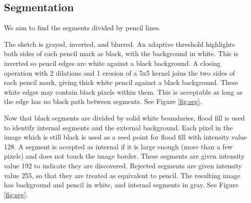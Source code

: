 \documentclass[11pt]{IEEEtran}
\begin{document}
\subsection{Segmentation}
We aim to find the segments divided by pencil lines.

The sketch is grayed, inverted, and blurred. An adaptive threshold highlights both sides of each pencil mark as black, with the background in white. This is inverted so pencil edges are white against a black background. A closing operation with 2 dilations and 1 erosion of a 5x5 kernel joins the two sides of each pencil mark, giving thick white pencil against a black background. These white edges may contain black pixels within them. This is acceptable as long as the edge has no black path between segments. See Figure \ref{fig:seg}.

Now that black segments are divided by solid white boundaries, flood fill is used to identify internal segments and the external background. Each pixel in the image which is still black is used as a seed point for flood fill with intensity value 128. A segment is accepted as internal if it is large enough (more than a few pixels) and does not touch the image border. These segments are given intensity value 192 to indicate they are discovered. Rejected segments are given intensity value 255, so that they are treated as equivalent to pencil. The resulting image has background and pencil in white, and internal segments in gray. See Figure \ref{fig:seg}.
\end{document}
